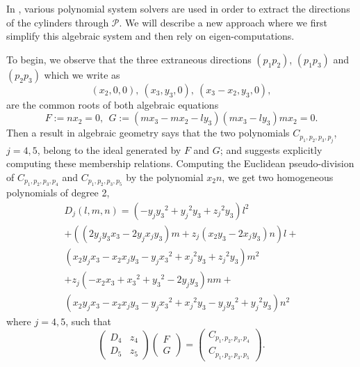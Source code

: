 \documentclass[5p]{elsarticle}
\newcommand\Pc{\mathcal P}
\newcommand{\com}[1]{{\color{black} #1}}
\begin{document}
  
In \cite{Devillers02,BKM05,Lichtblau12}, various polynomial system solvers are used in order to extract the directions of the cylinders through $\Pc$. We will describe a new approach where we first simplify this algebraic system and then rely on eigen-computations.   

\com{To begin}, we observe that the three extraneous directions $(p_{1}p_{2})$, $(p_{1}p_{3})$ and $(p_{2}p_{3})$ which \com{we write as} 
$$(x_2,0,0), \ (x_3,y_3,0), \ (x_3-x_2,y_3,0),$$
are the common roots of both algebraic equations  
$$F:=nx_{2}=0, \ \ G:=(mx_3-mx_2-ly_3)(mx_3-ly_3)mx_2=0.$$
Then a result in algebraic geometry says that the two polynomials $C_{p_{1},p_{2},p_{3},p_{j}}$, $j=4,5$, belong to the ideal generated by $F$ and $G$; and suggests {explicitly computing} these membership relations. Computing the Euclidean pseudo-division of $C_{p_{1},p_{2},p_{3},p_{4}}$ and $C_{p_{1},p_{2},p_{3},p_{5}}$ by the polynomial $x_2n$, we get two homogeneous polynomials of degree 2,
 \begin{multline*}
 	D_j(l,m,n)=
  \left( -{ y_j}{{ y_3}}^{2}+{{ y_j}}^{2}{ y_3}+{{ z_j}}^{2
 }{ y_3} \right) {l}^{2} \\ 
 + \left(  \left( 2{ y_j}{ y_3}{ 
 x_3}-2{ y_j}{ x_j}{ y_3} \right) m+{ z_j} \left( { 
 x_2}{ y_3}-2{ x_j}{ y_3} \right) n \right) l+ \\
 \left( { 
 x_2}{ y_j}{ x_3}-{ x_2}{ x_j}{ y_3}-{ y_j}{{ 
 x_3}}^{2}+{{ x_j}}^{2}{ y_3}+{{ z_j}}^{2}{ y_3} \right) {m}^{2} \\
 +{ z_j} \left( -{ x_2}{ x_3}+{{ x_3}}^{2}+{{ y_3}}^{2}-2
 { y_j}{ y_3} \right) nm+ \\ 
 \left( { x_2}{ y_j}{ x_3}-{
  x_2}{ x_j}{ y_3}-{ y_j}{{ x_3}}^{2}+{{ x_j}}^{2}{
  y_3}-{ y_j}{{ y_3}}^{2}+{{ y_j}}^{2}{ y_3} \right) {n}^{2
 }
 \end{multline*}
where $j=4,5$, such that
$$
\left(
\begin{array}{cc}
D_{4} & z_{4} \\
D_{5} & z_{5} 
\end{array}
\right)
\left(
\begin{array}{c}
F \\ G
\end{array}
\right)
=
\left(
\begin{array}{c}
 C_{p_{1},p_{2},p_{3},p_{4}} \\ C_{p_{1},p_{2},p_{3},p_{5}}
\end{array}
\right).
$$
\end{document}
